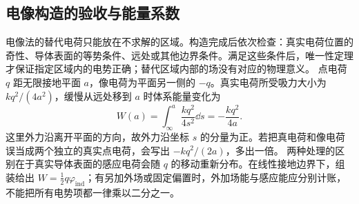\subsection{电像构造的验收与能量系数}
电像法的替代电荷只能放在不求解的区域。构造完成后依次检查：真实电荷位置的奇性、导体表面的等势条件、远处或其他边界条件。满足这些条件后，唯一性定理才保证指定区域内的电势正确；替代区域内部的场没有对应的物理意义。
点电荷 $q$ 距无限接地平面 $a$，像电荷为平面另一侧的 $-q$。真实电荷所受吸力大小为 $kq^2/(4a^2)$，缓慢从远处移到 $a$ 时体系能量变化为
\[
 W(a)=\int_{\infty}^{a}\frac{kq^2}{4s^2}\dd s
 =-\frac{kq^2}{4a}.
\]
这里外力沿离开平面的方向，故外力沿坐标 $s$ 的分量为正。若把真电荷和像电荷误当成两个独立的真实点电荷，会写出 $-kq^2/(2a)$，多出一倍。
两种处理的区别在于真实导体表面的感应电荷会随 $q$ 的移动重新分布。在线性接地边界下，组装给出 $W=\tfrac12q\varphi_{\mathrm{ind}}$；有另加外场或固定偏置时，外加场能与感应能应分别计账，不能把所有电势项都一律乘以二分之一。

